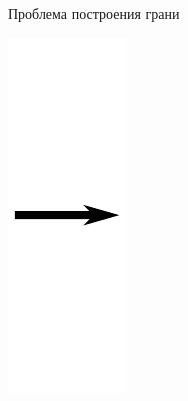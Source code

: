 \documentclass[]{beamer} %
\begin{document}
\begin{frame}{Проблема построения грани}
\begin{minipage}{.1\textwidth}
        \includegraphics[width=0.8\linewidth]{affine2.pdf}

\end{minipage}
\end{frame}
\end{document}
